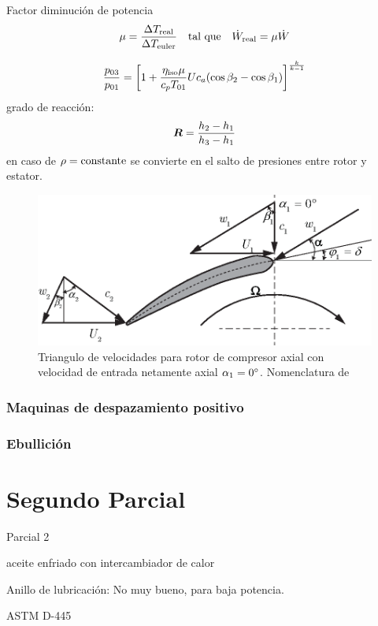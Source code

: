 \documentclass{article}
\begin{document}
Factor diminución de potencia
\[
\mu = \frac{\Delta {T_{\mathrm{real}}}}{\Delta {T_{\mathrm{euler}}}} \quad \text{tal que} \quad {\dot{W}_{\mathrm{real}}} = \mu \dot{W}
\]

\[
\frac{p_{03}}{p_{01}} = \left[1 + \frac{\eta_{\mathrm{iso}} \mu}{c_p T_{01}}U c_{a } (\cos \beta_2 - \cos \beta_1) \right]^{\frac{k}{k-1}}
\]
grado de reacción:
\[
{\bm{R}} = \frac{h_2 - h_1}{h_3 - h_1}
\]
en caso de $\rho = \textrm{constante}$ se convierte en el salto de presiones entre rotor y estator.
\begin{figure}[htb!]
    \centering
    \includegraphics{fig/pumpVelTriangle.eps}
    \caption{Triangulo de velocidades para rotor de compresor axial con velocidad de entrada netamente axial $\alpha_1 = 0{^\circ}$. Nomenclatura de \cite{TurboDick} }
    \label{fig:velocitytrianglepump}
\end{figure}

\section{Maquinas de despazamiento positivo}





\section{Ebullición}

\part{Segundo Parcial}

Parcial 2

aceite enfriado con intercambiador de calor

Anillo de lubricación: No muy bueno, para baja potencia.

ASTM D-445
\end{document}
